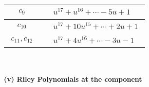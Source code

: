\documentclass[1p]{elsarticle_modified}
\theoremstyle{definition}
\begin{document}
\begin{tabular}{m{50pt}|m{274pt}}
\hline $$\begin{aligned}c_{9}\end{aligned}$$&$\begin{aligned}
&u^{17}+u^{16}+\cdots-5 u+1
\end{aligned}$\\
\hline $$\begin{aligned}c_{10}\end{aligned}$$&$\begin{aligned}
&u^{17}+10 u^{15}+\cdots+2 u+1
\end{aligned}$\\
\hline $$\begin{aligned}c_{11},c_{12}\end{aligned}$$&$\begin{aligned}
&u^{17}+4 u^{16}+\cdots-3 u-1
\end{aligned}$\\
\hline
\end{tabular}\\~\\
\newpage\renewcommand{\arraystretch}{1}
\flushleft \textbf{(v) Riley Polynomials at the component}\newline \\
\end{document}
